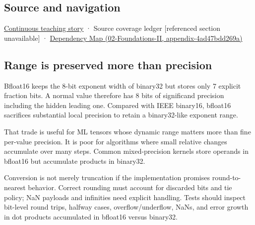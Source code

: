 \subsection{Source and navigation}\label{appendix-18b8dd966b5d-source-and-navigation}

\hyperref[01-foundations-i-ch001-choosing-what-information-to-keep]{Continuous teaching story} · {Source coverage ledger {[}referenced section unavailable{]}} · \href{../02-Foundations-II/main.pdf\#nameddest=appendix-4ad47bdd269a}{Dependency Map (02-Foundations-II, appendix-4ad47bdd269a)}

\subsection{Range is preserved more than precision}\label{appendix-18b8dd966b5d-range-is-preserved-more-than-precision}

Bfloat16 keeps the 8-bit exponent width of binary32 but stores only 7 explicit fraction bits. A normal value therefore has 8 bits of significand precision including the hidden leading one. Compared with IEEE binary16, bfloat16 sacrifices substantial local precision to retain a binary32-like exponent range.

That trade is useful for ML tensors whose dynamic range matters more than fine per-value precision. It is poor for algorithms where small relative changes accumulate over many steps. Common mixed-precision kernels store operands in bfloat16 but accumulate products in binary32.

Conversion is not merely truncation if the implementation promises round-to-nearest behavior. Correct rounding must account for discarded bits and tie policy; NaN payloads and infinities need explicit handling. Tests should inspect bit-level round trips, halfway cases, overflow/underflow, NaNs, and error growth in dot products accumulated in bfloat16 versus binary32.
